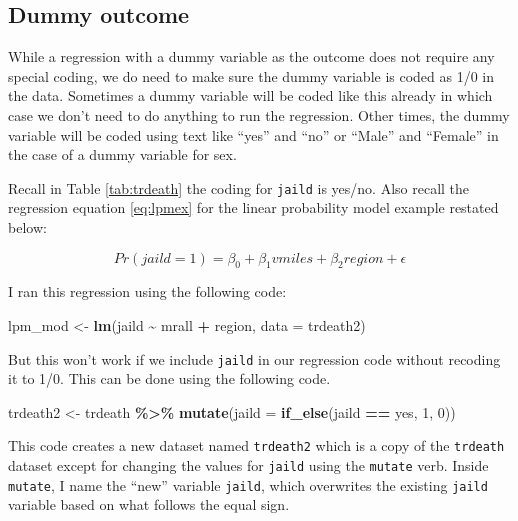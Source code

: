 \documentclass[
]{book}
\makeatletter
\newenvironment{Shaded}{\begin{snugshade}}{\end{snugshade}}
\newcommand{\AttributeTok}[1]{\textcolor[rgb]{0.27,0.27,0.27}{#1}}
\newcommand{\DecValTok}[1]{\textcolor[rgb]{0.06,0.06,0.06}{#1}}
\newcommand{\FunctionTok}[1]{\textcolor[rgb]{0.27,0.27,0.27}{\textbf{#1}}}
\newcommand{\NormalTok}[1]{#1}
\newcommand{\OtherTok}[1]{\textcolor[rgb]{0.37,0.37,0.37}{#1}}
\newcommand{\SpecialCharTok}[1]{\textcolor[rgb]{0.43,0.43,0.43}{\textbf{#1}}}
\newcommand{\StringTok}[1]{\textcolor[rgb]{0.5,0.5,0.5}{#1}}
\newenvironment{kframe}{%
\medskip{}
\setlength{\fboxsep}{.8em}
 \def\at@end@of@kframe{}%
 \ifinner\ifhmode%
  \def\at@end@of@kframe{\end{minipage}}%
  \begin{minipage}{\columnwidth}%
 \fi\fi%
 \def\FrameCommand##1{\hskip\@totalleftmargin \hskip-\fboxsep
 \colorbox{shadecolor}{##1}\hskip-\fboxsep
     \hskip-\linewidth \hskip-\@totalleftmargin \hskip\columnwidth}%
 \MakeFramed {\advance\hsize-\width
   \@totalleftmargin\z@ \linewidth\hsize
   \@setminipage}}%
 {\par\unskip\endMakeFramed%
 \at@end@of@kframe}
\renewenvironment{Shaded}{\begin{kframe}}{\end{kframe}}
\makeatother
\begin{document}
\hypertarget{dummy-outcome}{%
\subsection{Dummy outcome}\label{dummy-outcome}}

While a regression with a dummy variable as the outcome does not require any special coding, we do need to make sure the dummy variable is coded as 1/0 in the data. Sometimes a dummy variable will be coded like this already in which case we don't need to do anything to run the regression. Other times, the dummy variable will be coded using text like ``yes'' and ``no'' or ``Male'' and ``Female'' in the case of a dummy variable for sex.

Recall in Table \ref{tab:trdeath} the coding for \texttt{jaild} is yes/no. Also recall the regression equation \eqref{eq:lpmex} for the linear probability model example restated below:

\[Pr(jaild=1)=\beta_0+\beta_1vmiles+\beta_2region+\epsilon\]

I ran this regression using the following code:

\begin{Shaded}
\begin{Highlighting}[]
\NormalTok{lpm\_mod }\OtherTok{\textless{}{-}} \FunctionTok{lm}\NormalTok{(jaild }\SpecialCharTok{\textasciitilde{}}\NormalTok{ mrall }\SpecialCharTok{+}\NormalTok{ region, }\AttributeTok{data =}\NormalTok{ trdeath2)}
\end{Highlighting}
\end{Shaded}

But this won't work if we include \texttt{jaild} in our regression code without recoding it to 1/0. This can be done using the following code.

\begin{Shaded}
\begin{Highlighting}[]
\NormalTok{trdeath2 }\OtherTok{\textless{}{-}}\NormalTok{ trdeath }\SpecialCharTok{\%\textgreater{}\%} 
  \FunctionTok{mutate}\NormalTok{(}\AttributeTok{jaild =} \FunctionTok{if\_else}\NormalTok{(jaild }\SpecialCharTok{==} \StringTok{\textquotesingle{}yes\textquotesingle{}}\NormalTok{, }\DecValTok{1}\NormalTok{, }\DecValTok{0}\NormalTok{))}
\end{Highlighting}
\end{Shaded}

This code creates a new dataset named \texttt{trdeath2} which is a copy of the \texttt{trdeath} dataset except for changing the values for \texttt{jaild} using the \texttt{mutate} verb. Inside \texttt{mutate}, I name the ``new'' variable \texttt{jaild}, which overwrites the existing \texttt{jaild} variable based on what follows the equal sign.
\end{document}
